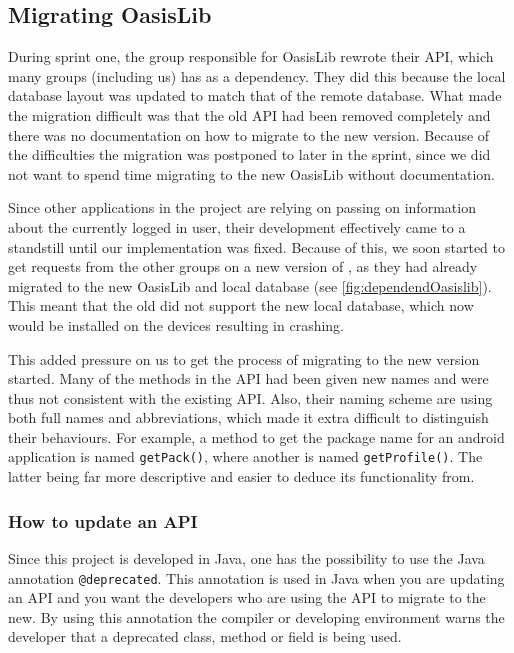 
\subsection{Migrating OasisLib}\label{sec:oasismigration}
During sprint one, the group responsible for OasisLib rewrote their API, which many groups (including us) has as a dependency.
They did this because the local database layout was updated to match that of the remote database.
What made the migration difficult was that the old API had been removed completely and there was no documentation on how to migrate to the new version.
Because of the difficulties the migration was postponed to later in the sprint, since we did not want to spend time migrating to the new OasisLib without documentation.

Since other applications in the \giraf project are relying on \launcher passing on information about the currently logged in user, their development effectively came to a standstill until our implementation was fixed.
Because of this, we soon started to get requests from the other groups on a new version of \launcher, as they had already migrated to the new OasisLib and local database (see \cref{fig:dependendOasislib}).
This meant that the old \launcher did not support the new local database, which now would be installed on the devices resulting in \launcher crashing.


This added pressure on us to get the process of migrating to the new version started.
Many of the methods in the API had been given new names and were thus not consistent with the existing API.
Also, their naming scheme are using both full names and abbreviations, which made it extra difficult to distinguish their behaviours.
For example, a method to get the package name for an android application is named \lstinline{getPack()}, where another is named \lstinline{getProfile()}.
The latter being far more descriptive and easier to deduce its functionality from.

\subsubsection{How to update an API}
Since this project is developed in Java, one has the possibility to use the Java annotation \lstinline{@deprecated}.
This annotation is used in Java when you are updating an API and you want the developers who are using the API to migrate to the new.
By using this annotation the compiler or developing environment warns the developer that a deprecated class, method or field is being used.

